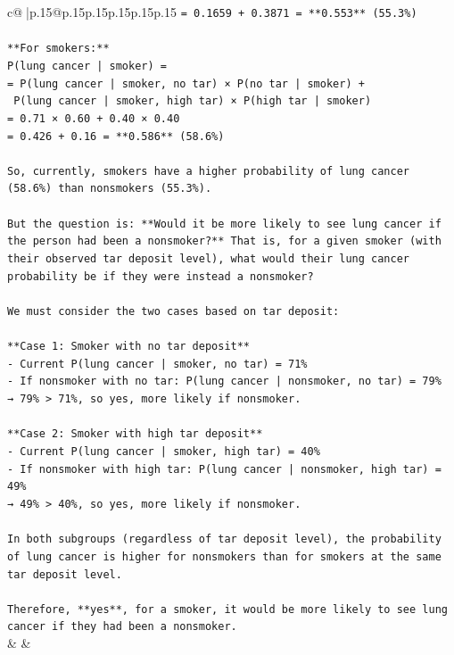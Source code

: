 \documentclass{article}
\begin{document}
{\begin{supertabular}{c@{$\;$}|p{.15\linewidth}@{}p{.15\linewidth}p{.15\linewidth}p{.15\linewidth}p{.15\linewidth}p{.15\linewidth}}
{{{\texttt{= 0.1659 + 0.3871 = **0.553** (55.3\%)} \\
\\ 
\texttt{**For smokers:**} \\
\texttt{P(lung cancer | smoker) =  } \\
\texttt{= P(lung cancer | smoker, no tar) × P(no tar | smoker) +  } \\
\texttt{  P(lung cancer | smoker, high tar) × P(high tar | smoker)  } \\
\texttt{= 0.71 × 0.60 + 0.40 × 0.40  } \\
\texttt{= 0.426 + 0.16 = **0.586** (58.6\%)} \\
\\ 
\texttt{So, currently, smokers have a higher probability of lung cancer (58.6\%) than nonsmokers (55.3\%).} \\
\\ 
\texttt{But the question is: **Would it be more likely to see lung cancer if the person had been a nonsmoker?** That is, for a given smoker (with their observed tar deposit level), what would their lung cancer probability be if they were instead a nonsmoker?} \\
\\ 
\texttt{We must consider the two cases based on tar deposit:} \\
\\ 
\texttt{**Case 1: Smoker with no tar deposit**} \\
\texttt{{-} Current P(lung cancer | smoker, no tar) = 71\%} \\
\texttt{{-} If nonsmoker with no tar: P(lung cancer | nonsmoker, no tar) = 79\%} \\
\texttt{→ 79\% > 71\%, so yes, more likely if nonsmoker.} \\
\\ 
\texttt{**Case 2: Smoker with high tar deposit**} \\
\texttt{{-} Current P(lung cancer | smoker, high tar) = 40\%} \\
\texttt{{-} If nonsmoker with high tar: P(lung cancer | nonsmoker, high tar) = 49\%} \\
\texttt{→ 49\% > 40\%, so yes, more likely if nonsmoker.} \\
\\ 
\texttt{In both subgroups (regardless of tar deposit level), the probability of lung cancer is higher for nonsmokers than for smokers at the same tar deposit level.} \\
\\ 
\texttt{Therefore, **yes**, for a smoker, it would be more likely to see lung cancer if they had been a nonsmoker.} \\
            }
        }
    }
    & & \\ \\


\end{supertabular}}
\end{document}
